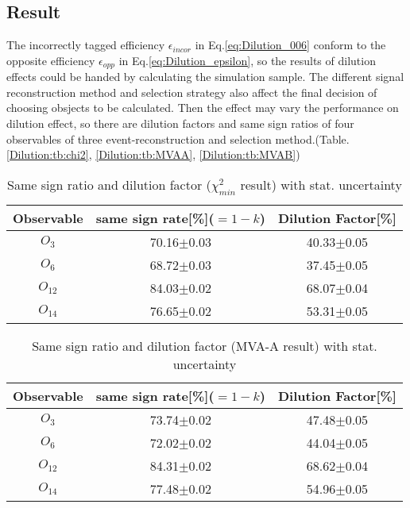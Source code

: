 	\subsection{Result}
	\label{Dilution:result}
		
		The incorrectly tagged efficiency $\epsilon_{incor}$ in Eq.\ref{eq:Dilution_006} conform to the opposite efficiency $\epsilon_{opp}$ in Eq.\ref{eq:Dilution_epsilon}, so the results of dilution effects could be handed by calculating the simulation sample. The different signal reconstruction method and selection strategy also affect the final decision of choosing obsjects to be calculated. Then the effect may vary the performance on dilution effect, so there are dilution factors and same sign ratios of four observables of three event-reconstruction and selection method.(Table. \ref{Dilution:tb:chi2}, \ref{Dilution:tb:MVAA}, \ref{Dilution:tb:MVAB})

		\begin{center}
		\setlength{\tabcolsep}{12pt}
		\begin{longtable}{ c | c c }
		\caption{Same sign ratio and dilution factor ($\chi^2_{min}$ result) with stat. uncertainty}\\
		Observable & same sign rate[\%]($=1-k$) & Dilution Factor[\%] \\
		\hline
		$O_{3}$ & 70.16$\pm$0.03  &  40.33$\pm$0.05  \\
		$O_{6}$ &  68.72$\pm$0.03  &  37.45$\pm$0.05  \\
		$O_{12}$ &  84.03$\pm$0.02  &  68.07$\pm$0.04  \\
		$O_{14}$ &  76.65$\pm$0.02  &  53.31$\pm$0.05  \\
		\hline
		\end{longtable}
		\label{Dilution:tb:chi2}
		\end{center}

		\begin{center}
		\setlength{\tabcolsep}{12pt}
		\begin{longtable}{ c | c c }
		\caption{Same sign ratio and dilution factor (MVA-A result) with stat. uncertainty}\\
		Observable & same sign rate[\%]($=1-k$) & Dilution Factor[\%] \\
		\hline
		$O_{3}$ & 73.74$\pm$0.02  &  47.48$\pm$0.05  \\
		$O_{6}$ &  72.02$\pm$0.02  &  44.04$\pm$0.05  \\
		$O_{12}$ &  84.31$\pm$0.02  &  68.62$\pm$0.04  \\
		$O_{14}$ &  77.48$\pm$0.02  &  54.96$\pm$0.05  \\
		\hline
		\end{longtable}
		\label{Dilution:tb:MVAA}
		\end{center}

